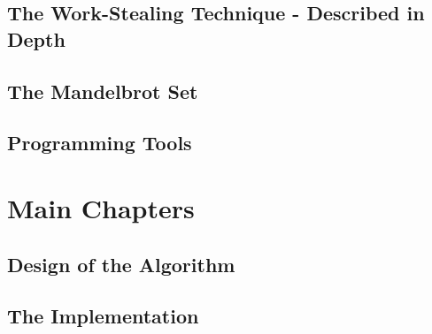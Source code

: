 
\section{The Work-Stealing Technique - Described in Depth}

\section{The Mandelbrot Set}

\section{Programming Tools}

\chapter{Main Chapters}
\section{Design of the Algorithm}

\section{The Implementation}

